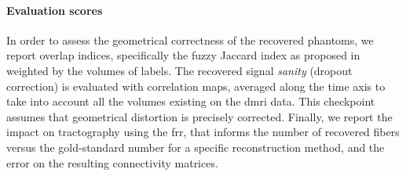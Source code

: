 \paragraph*{Evaluation scores}
In order to assess the geometrical correctness of the
recovered phantoms, we report overlap indices, specifically
the fuzzy Jaccard index as proposed in
\cite{crum_generalized_2006} weighted by the volumes of
labels. The recovered signal \emph{sanity} (dropout 
correction) is evaluated with correlation maps, averaged
along the time axis to take into account all the volumes
existing on the \gls*{dmri} data. This checkpoint
assumes that geometrical distortion is precisely
corrected. Finally, we report the impact on tractography
using the \gls*{frr}, that informs the number of recovered
fibers versus the gold-standard number for a specific
reconstruction method, and the error on the resulting
connectivity matrices.

